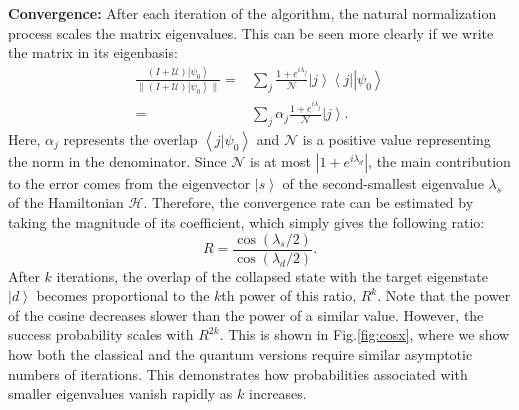 \documentclass[onecolumn,10pt]{article}
\newcommand{\ket}[1]{\ensuremath{\left|#1\right\rangle}} %
\newcommand{\bra}[1]{\ensuremath{\left\langle#1\right|}} %
\newcommand{\braket}[2]{\ensuremath{\left\langle#1|#2\right\rangle}}
\theoremstyle{remark}
\theoremstyle{plain}
\begin{document}
\textbf{Convergence: } After each iteration of the algorithm, the natural normalization process scales the matrix eigenvalues. This can be seen more clearly if we write the matrix in its eigenbasis:
\begin{equation}
\begin{split}
    \frac{\left(I + \mathcal{U}\right)\ket{\psi_0}}{{\|(I + \mathcal{U})\ket{\psi_0}\|}} = & \sum_j \frac{1 + e^{i\lambda_j}}{\mathcal{N}}\ket{j}\bra{j} \ket{\psi_0}
    \\ = & \sum_j \alpha_j \frac{1 + e^{i\lambda_j}}{\mathcal{N}} \ket{j}.
\end{split}
\end{equation}
Here, $\alpha_j$ represents the overlap $\braket{j}{\psi_0}$ and $\mathcal{N}$ is a positive value representing the norm in the denominator. Since $\mathcal{N}$ is at most $|1+e^{i\lambda_d}|$, the main contribution to the error comes from the eigenvector \(\ket{s}\) of the second-smallest eigenvalue $\lambda_s$ of the Hamiltonian $\mathcal{H}$. Therefore, the convergence rate can be estimated by taking the magnitude of its coefficient, which simply gives the following ratio:
\begin{equation}
\label{eq:ratio}
R = \frac{\cos(\lambda_s/2)}{\cos(\lambda_d/2)}.
\end{equation}
After $k$ iterations, the overlap of the collapsed state with the target eigenstate \(\ket{d}\) becomes proportional to the $k$th power of this ratio, \(R^k\). Note that the power of the cosine decreases slower than the power of a similar value.  
However, the success probability scales with \(R^{2k}\). This is shown in Fig.\ref{fig:cosx}, where we show how both the classical and the quantum versions require similar asymptotic numbers of iterations. This demonstrates how probabilities associated with smaller eigenvalues vanish rapidly as \(k\) increases.
\end{document}
